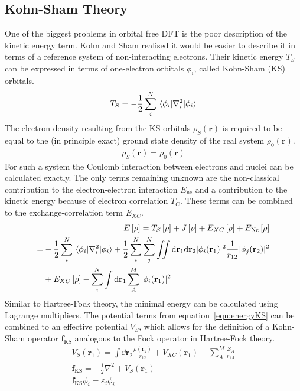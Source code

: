 \subsection{Kohn-Sham Theory}
\label{sec:kohnshamtheory}

One of the biggest problems in orbital free \ac{DFT} is the poor description of
the kinetic energy term. Kohn and Sham realised it would be easier to describe
it in terms of a reference system of non-interacting electrons. Their kinetic
energy $T_S$ can be expressed in terms of
one-electron orbitals $\phi_i$, called Kohn-Sham (KS) orbitals.
%
\begin{align}
    T_S=-\frac{1}{2}\sum_i^N\mel{\phi_i}{\nabla_i^2}{\phi_i}
\end{align}
%
The electron density resulting from the KS orbitals $\rho_S(\mathbf{r})$ is
required to be equal to the (in principle exact) ground state density of the
real system $\rho_0(\mathbf{r})$.
%
\begin{align}
    \rho_S(\mathbf{r}) = \rho_0(\mathbf{r})
\end{align}
%
For such a system the Coulomb interaction between electrons and nuclei can be
calculated exactly. The only terms remaining unknown are the non-classical
contribution to the electron-electron interaction $E_\text{nc}$ and a
contribution to the kinetic energy because of electron correlation $T_C$. These
terms can be combined to the exchange-correlation term $E_{XC}$.
%
\begin{align}
    E\left[\rho\right]=T_S\left[\rho\right] + J\left[\rho\right] + E_{XC}\left[\rho\right] + E_\text{Ne}\left[\rho\right] \\
    \begin{aligned}
        =&-\frac{1}{2}\sum_i^N\mel{\phi_i}{\nabla_i^2}{\phi_i} + \frac{1}{2}\sum_i^N\sum_j^N\iint \dd\mathbf{r}_1\dd\mathbf{r}_2|\phi_i(\mathbf{r}_1)|^2\frac{1}{r_{12}}|\phi_j(\mathbf{r}_2)|^2 \\
        &+ E_{XC}\left[\rho\right] - \sum_i^N\int\dd\mathbf{r}_1\sum_A^M|\phi_i(\mathbf{r}_1)|^2
    \end{aligned}\label{eqn:energyKS}
\end{align}
%
Similar to Hartree-Fock theory, the minimal energy can be calculated using
Lagrange multipliers. The potential terms from equation~\eqref{eqn:energyKS}
can be combined to an effective potential $V_S$, which allows for the
definition of a Kohn-Sham operator $\mathbf{f}_\text{KS}$ analogous to the Fock
operator in Hartree-Fock theory.
%
\begin{align}
    V_S(\mathbf{r}_1) = \int\dd\mathbf{r}_2\frac{\rho(\mathbf{r}_2)}{r_{12}} + V_{XC}(\mathbf{r}_1) - \sum_A^M\frac{Z_A}{r_{1A}}\\
    \mathbf{f}_\text{KS} = -\frac{1}{2}\nabla^2+V_S(\mathbf{r}_1)\\
    \mathbf{f}_\text{KS}\phi_i=\varepsilon_i\phi_i
\end{align}
